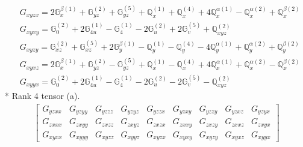 \documentclass[fleqn,8pt,landscape]{jsarticle}
\begin{document}
\begin{align*}
& G_{xyzx} = 2 \mathbb{G}_{x}^{\beta(1)} + \mathbb{G}_{yz}^{(2)} + \mathbb{G}_{yz}^{(5)} + \mathbb{Q}_{x}^{(1)} + \mathbb{Q}_{x}^{(4)} + 4 \mathbb{Q}_{x}^{\alpha(1)} - \mathbb{Q}_{x}^{\alpha(2)} + \mathbb{Q}_{x}^{\beta(2)} \\
& G_{xyxy} = \mathbb{G}_{0}^{(2)} + 2 \mathbb{G}_{4u}^{(1)} - \mathbb{G}_{4}^{(1)} - 2 \mathbb{G}_{u}^{(2)} + 2 \mathbb{G}_{v}^{(5)} + \mathbb{Q}_{xyz}^{(2)} \\
& G_{xyzy} = \mathbb{G}_{xz}^{(2)} + \mathbb{G}_{xz}^{(5)} + 2 \mathbb{G}_{y}^{\beta(1)} - \mathbb{Q}_{y}^{(1)} - \mathbb{Q}_{y}^{(4)} - 4 \mathbb{Q}_{y}^{\alpha(1)} + \mathbb{Q}_{y}^{\alpha(2)} + \mathbb{Q}_{y}^{\beta(2)} \\
& G_{xyxz} = 2 \mathbb{G}_{x}^{\beta(1)} + \mathbb{G}_{yz}^{(2)} - \mathbb{G}_{yz}^{(5)} + \mathbb{Q}_{x}^{(1)} - \mathbb{Q}_{x}^{(4)} + 4 \mathbb{Q}_{x}^{\alpha(1)} + \mathbb{Q}_{x}^{\alpha(2)} - \mathbb{Q}_{x}^{\beta(2)} \\
& G_{xyyx} = \mathbb{G}_{0}^{(2)} + 2 \mathbb{G}_{4u}^{(1)} - \mathbb{G}_{4}^{(1)} - 2 \mathbb{G}_{u}^{(2)} - 2 \mathbb{G}_{v}^{(5)} - \mathbb{Q}_{xyz}^{(2)}
\end{align*}
* Rank 4 tensor (a).
\begin{align*}
\begin{bmatrix} G_{yzxx} & G_{yzyy} & G_{yzzz} & G_{yzyz} & G_{yzzx} & G_{yzxy} & G_{yzzy} & G_{yzxz} & G_{yzyx} \\ G_{zxxx} & G_{zxyy} & G_{zxzz} & G_{zxyz} & G_{zxzx} & G_{zxxy} & G_{zxzy} & G_{zxxz} & G_{zxyx} \\ G_{xyxx} & G_{xyyy} & G_{xyzz} & G_{xyyz} & G_{xyzx} & G_{xyxy} & G_{xyzy} & G_{xyxz} & G_{xyyx} \end{bmatrix}
\end{align*}
\end{document}
